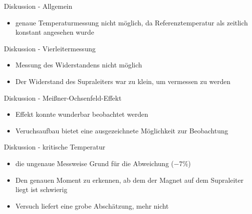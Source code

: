 \begin{frame}{Diskussion - Allgemein}
  \begin{itemize}
    \item{ genaue Temperaturmessung nicht möglich, da Referenztemperatur als zeitlich konstant angesehen wurde}
  \end{itemize}
\end{frame}

\begin{frame}{Diskussion - Vierleitermessung}
  \begin{itemize}
    \item{Messung des Widerstandens nicht möglich}
    \item {Der Widerstand des Supraleiters war zu klein, um vermessen zu werden}
\end{itemize}
\end{frame}

\begin{frame}{Diskussion - Meißner-Ochsenfeld-Effekt}
  \begin{itemize}
    \item{ Effekt konnte wunderbar beobachtet werden}
    \item{ Veruchsaufbau bietet eine ausgezeichnete Möglichkeit zur Beobachtung}
\end{itemize}
\end{frame}

\begin{frame} {Diskussion - kritische Temperatur}
  \begin{itemize}
    \item{die ungenaue Messweise Grund für die Abweichung ($-7\%$)}
    \item{Den genauen Moment zu erkennen, ab dem der Magnet auf dem Supraleiter liegt ist schwierig}
    \item{Versuch liefert eine grobe Abschätzung, mehr nicht}
  \end{itemize}
\end{frame}
